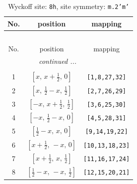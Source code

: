 \documentclass[fleqn,8pt]{jsarticle}
\begin{document}
\begin{longtable}{ccc}
\caption{Wyckoff site: {\tt 8h}, site symmetry: {\tt m.2'm'}}
 \\
 \hline \hline
No. & position & mapping \\ \hline \endfirsthead

\multicolumn{2}{l}{\tablename\ \thetable{}} \\
 \hline \hline
No. & position & mapping \\ \hline \endhead

 \hline \hline
\multicolumn{2}{r}{\footnotesize\it continued ...} \\ \endfoot

 \hline \hline
\multicolumn{2}{r}{} \\ \endlastfoot

1 & $\left[ x,\, x + \frac{1}{2},\, 0 \right]$ & {\tt [1,8,27,32]} \\ \hline
2 & $\left[ x,\, \frac{1}{2} - x,\, \frac{1}{2} \right]$ & {\tt [2,7,26,29]} \\ \hline
3 & $\left[ - x,\, x + \frac{1}{2},\, \frac{1}{2} \right]$ & {\tt [3,6,25,30]} \\ \hline
4 & $\left[ - x,\, \frac{1}{2} - x,\, 0 \right]$ & {\tt [4,5,28,31]} \\ \hline
5 & $\left[ \frac{1}{2} - x,\, x,\, 0 \right]$ & {\tt [9,14,19,22]} \\ \hline
6 & $\left[ x + \frac{1}{2},\, - x,\, 0 \right]$ & {\tt [10,13,18,23]} \\ \hline
7 & $\left[ x + \frac{1}{2},\, x,\, \frac{1}{2} \right]$ & {\tt [11,16,17,24]} \\ \hline
8 & $\left[ \frac{1}{2} - x,\, - x,\, \frac{1}{2} \right]$ & {\tt [12,15,20,21]} \\
\end{longtable}
\renewcommand{\arraystretch}{1.2}
\end{document}
